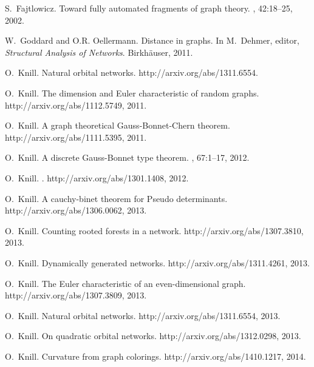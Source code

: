 \documentclass[12pt]{amsart}
\theoremstyle{definition}
\begin{document}
\begin{thebibliography}{10}
S.~Fajtlowicz.
\newblock Toward fully automated fragments of graph theory.
, 42:18--25, 2002.

W.~Goddard and O.R. Oellermann.
\newblock Distance in graphs.
\newblock In M.~Dehmer, editor, {\em Structural Analysis of Networks}.
  Birkh{\"a}user, 2011.

O.~Knill.
\newblock Natural orbital networks.
\newblock http://arxiv.org/abs/1311.6554.

O.~Knill.
\newblock The dimension and {Euler} characteristic of random graphs.
\newblock {\\}http://arxiv.org/abs/1112.5749, 2011.

O.~Knill.
\newblock A graph theoretical {Gauss-Bonnet-Chern} theorem.
\newblock {\\}http://arxiv.org/abs/1111.5395, 2011.

O.~Knill.
\newblock A discrete {Gauss-Bonnet} type theorem.
, 67:1--17, 2012.

O.~Knill.
.
\newblock {\\}http://arxiv.org/abs/1301.1408, 2012.

O.~Knill.
\newblock A cauchy-binet theorem for {P}seudo determinants.
\newblock {\\}http://arxiv.org/abs/1306.0062, 2013.

O.~Knill.
\newblock Counting rooted forests in a network.
\newblock http://arxiv.org/abs/1307.3810, 2013.

O.~Knill.
\newblock Dynamically generated networks.
\newblock http://arxiv.org/abs/1311.4261, 2013.

O.~Knill.
\newblock The {E}uler characteristic of an even-dimensional graph.
\newblock http://arxiv.org/abs/1307.3809, 2013.

O.~Knill.
\newblock Natural orbital networks.
\newblock http://arxiv.org/abs/1311.6554, 2013.

O.~Knill.
\newblock On quadratic orbital networks.
\newblock http://arxiv.org/abs/1312.0298, 2013.

O.~Knill.
\newblock Curvature from graph colorings.
\newblock http://arxiv.org/abs/1410.1217, 2014.


\end{thebibliography}
\end{document}
